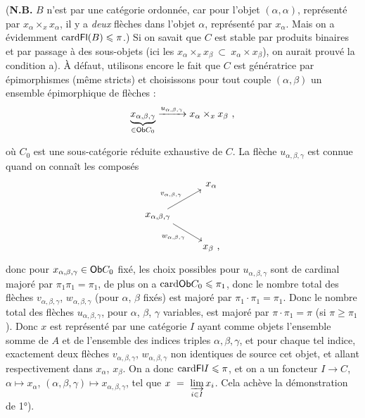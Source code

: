 (\textbf{N.B.} $B$ n'est par une catégorie ordonnée, car pour l'objet $(\alpha,\alpha)$, représenté par $x_{\alpha}\times_x x_{\alpha}$, %
il y a \textit{deux} flèches dans l'objet $\alpha$, représenté par $x_{\alpha}$. Mais on a évidemment $\mathrm{card} \mathsf{Fl}(B) \leqslant \pi$.) Si on savait que $C$ est stable par produits binaires et par passage à des sous-objets (ici les $x_{\alpha} \times_x x_{\beta} \ \subset \ x_{\alpha} \times x_{\beta}$), on aurait prouvé la condition a). À défaut, utilisons encore le fait que $C$ est génératrice par épimorphismes (même stricts) et choisissons pour tout couple $(\alpha,\beta)$ un ensemble épimorphique de flèches :
\[ \underbrace{x_{\alpha,\beta,\gamma}}_{\in \mathsf{Ob} C_0} \xrightarrow{u_{\alpha,\beta,\gamma}} x_{\alpha} \times_x x_{\beta} \ , \]

où $C_0$ est une sous-catégorie réduite exhaustive de $C$. La flèche $u_{\alpha,\beta,\gamma}$ est connue quand on connaît les composés
\[
\begin{tikzcd}
& x_{\alpha} \\
x_{\alpha,\beta,\gamma} \arrow[ur, "v_{\alpha,\beta,\gamma}"] \arrow[dr, "w_{\alpha,\beta,\gamma}"'] & \\
& x_{\beta} \text{ ,}
\end{tikzcd}
\]
donc pour $x_{\alpha,\beta,\gamma} \in \mathsf{Ob} C_0$ fixé, les choix possibles pour $u_{\alpha,\beta,\gamma}$ sont de cardinal majoré par $\pi_1\pi_1 = \pi_1$, de plus on a $\mathrm{card} \mathsf{Ob} C_0 \leqslant \pi_1$, donc le nombre total des flèches $v_{\alpha,\beta,\gamma}$, $w_{\alpha,\beta,\gamma}$ (pour $\alpha$, $\beta$ fixés) est majoré par $\pi_1 \cdot \pi_1 = \pi_1$. Donc le nombre total des flèches $u_{\alpha,\beta,\gamma}$, pour $\alpha$, $\beta$, $\gamma$ variables, est majoré par $\pi \cdot \pi_1 = \pi$ (si $\pi \geqslant \pi_1$). Donc $x$ est représenté par une catégorie $I$ ayant comme objets l'ensemble somme de $A$ et de l'ensemble des indices triples $\alpha,\beta,\gamma$, et pour chaque tel indice, exactement deux flèches $v_{\alpha,\beta,\gamma}$, $w_{\alpha,\beta,\gamma}$ non identiques de source cet objet, et allant respectivement dans $x_{\alpha}$, $x_{\beta}$. On a donc $\mathrm{card} \mathsf{Fl} I \leqslant \pi$, et on a un foncteur $I \longrightarrow C$, $\alpha \longmapsto x_{\alpha}$, $(\alpha,\beta,\gamma) \longmapsto x_{\alpha,\beta,\gamma}$, tel que $x \ = \ \varinjlim\limits_{i\in I} x_i$. Cela achève la démonstration de 1°).


